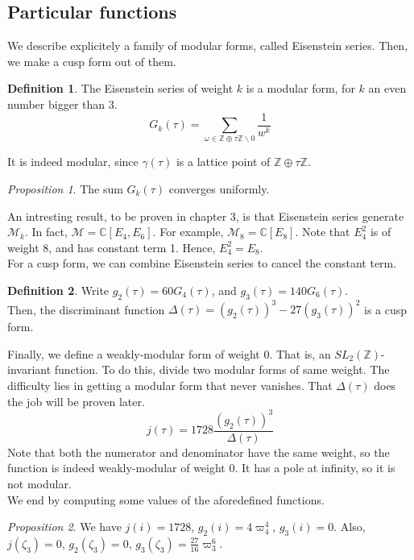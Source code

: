 \documentclass[11pt]{article}
\theoremstyle{plain}
\theoremstyle{definition}
\newtheorem{definition}{Definition}[section]
\theoremstyle{example}
\theoremstyle{remark}
\theoremstyle{lemma}
\theoremstyle{proposition}
\newtheorem{proposition}{Proposition}[section]
\theoremstyle{Problem}
\theoremstyle{Solution}
\theoremstyle{theorem}
\theoremstyle{corollary}
\begin{document}
\subsection{Particular functions}
We describe explicitely a family of modular forms, called Eisenstein series. Then, we make a cusp form out of them.\\
\begin{definition}
The Eisenstein series of weight $k$ is a modular form, for $k$ an even number bigger than $3$.
$$G_k(\tau) = \sum_{\omega\in\mathbb{Z}\oplus\tau\mathbb{Z}\backslash 0} \frac{1}{w^k}$$
\end{definition}
It is indeed modular, since $\gamma(\tau)$ is a lattice point of $\mathbb{Z}\oplus\tau\mathbb{Z}$.\\
\begin{proposition}
The sum $G_k(\tau)$ converges uniformly.
\end{proposition}
An intresting result, to be proven in chapter 3, is that Eisenstein series generate $\mathcal{M}_k$. In fact, $\mathcal{M} = \mathbb{C}[E_4,E_6]$. For example, $\mathcal{M}_8 = \mathbb{C}[E_8]$. Note that $E_4^2$ is of weight $8$, and has constant term 1. Hence, $E_4^2 = E_8$.\\
For a cusp form, we can combine Eisenstein series to cancel the constant term. 
\begin{definition}
Write $g_2(\tau) = 60G_4(\tau)$, and $g_3(\tau) = 140G_6(\tau)$.\\
Then, the discriminant function $\Delta(\tau) = (g_2(\tau))^3 - 27(g_3(\tau))^2$ is a cusp form.
\end{definition}
Finally, we define a weakly-modular form of weight $0$. That is, an $SL_2(\mathbb{Z})$-invariant function. To do this, divide two modular forms of same weight. The difficulty lies in getting a modular form that never vanishes. That $\Delta(\tau)$ does the job will be proven later.
$$j(\tau)=1728\frac{(g_2(\tau))^3}{\Delta(\tau)}$$
 Note that both the numerator and denominator have the same weight, so the function is indeed weakly-modular of weight $0$. It has a pole at infinity, so it is not modular.\\
We end by computing some values of the aforedefined functions.
\begin{proposition}
We have $j(i) = 1728$, $g_2(i)=4\varpi_4^4$, $g_3(i) = 0$.
Also, $j(\zeta_3) = 0$, $g_2(\zeta_3)=0$, $g_3(\zeta_3) = \frac{27}{16}\varpi_3^6$.
\end{proposition}
\end{document}
